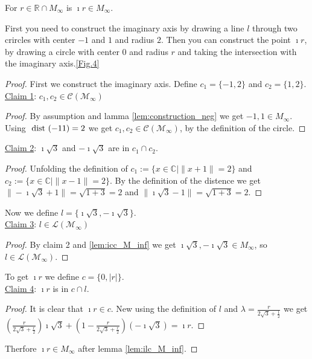 \begin{lemma}
    \label{lem:construction_imath_r}
    \leanok
    For $r \in \mathbb{R}\cap M_{\infty}$ is $\imath r \in M_{\infty}$.
\end{lemma}
First you need to construct the imaginary axis by drawing a line $l$ through two crircles with center $-1$ and $1$ and radius $2$. Then you can construct the point $\imath r$, by drawing a circle with center $0$ and radius $r$ and taking the intersection with the imaginary axis.\ref{Fig.4}
\begin{proof}
    First we construct the imaginary axis. Define $c_1 = \{-1,2\}$ and $c_2 = \{1,2\}$.\\
    \underline{Claim 1}: $c_1, c_2 \in \mathcal{C(M_{\infty})}$
    \begin{proof}
        By assumption and lamma \ref{lem:construction_neg} we get $-1, 1 \in M_{\infty}$. Using $\text{ dist }(-1 1)=2$ we get $c_1, c_2 \in \mathcal{C(M_{\infty})}$, by the definition of the circle.
    \end{proof}
    \underline{Claim 2}: $\imath\sqrt{3}$ and $-\imath\sqrt{3}$ are in $c_1 \cap c_2$.
    \begin{proof}
        Unfolding the definition of $c_1:=\{x\in\mathbb{C} \mid\|x+1\|=2\}$ and $c_2:=\{x\in\mathbb{C} \mid\|x-1\|=2\}$.
        By the definition of the distence we get $\|-\imath\sqrt{3}+1\| = \sqrt{1 + 3} = 2$ and $\|\imath\sqrt{3}-1\| = \sqrt{1 + 3} = 2$.
    \end{proof}
    Now we define $l = \{\imath\sqrt{3}, -\imath\sqrt{3}\}$.\\
    \underline{Claim 3}: $l \in \mathcal{L(M_{\infty})}$
    \begin{proof}
        By claim 2 and \ref{lem:icc_M_inf} we get $\imath\sqrt{3}, -\imath\sqrt{3} \in M_{\infty}$, so $l \in \mathcal{L(M_{\infty})}$.
    \end{proof}
    To get $\imath r$ we define $c = \{0,|r|\}$.\\
    \underline{Claim 4}: $\imath r$ is in $c \cap l$.
    \begin{proof}
        It is clear that $\imath r \in c$. New using the definition of $l$ and $\lambda = \frac{r}{2\sqrt{3}+\frac{1}{2}}$ we get $(\frac{r}{2\sqrt{3}+\frac{r}{2}})\imath\sqrt{3} + (1-\frac{r}{2\sqrt{3}+\frac{r}{2}})(-\imath\sqrt{3}) = \imath r$. 
    \end{proof}
    Therfore $\imath r \in M_{\infty}$ after lemma \ref{lem:ilc_M_inf}.
\end{proof}

